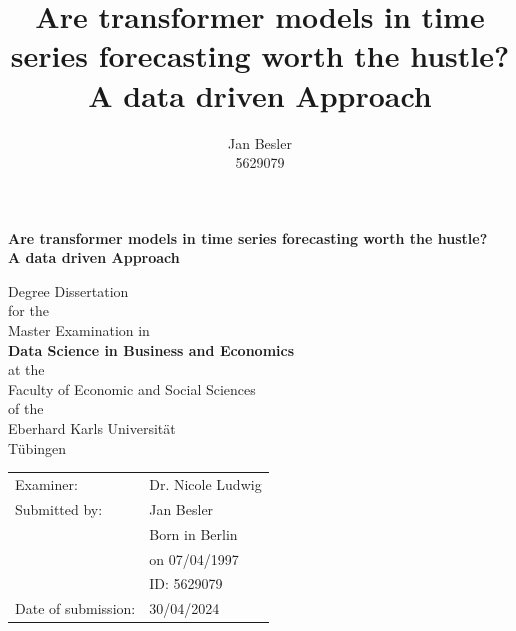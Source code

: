 \documentclass{article}
\title{Are transformer models in time series forecasting worth the hustle? \\
        \Large A data driven Approach}
\author{Jan Besler \\
        5629079}
\begin{document}
\begin{titlepage}       

\thispagestyle{empty}   

\begin{center}
\vspace*{1cm}
{\bf  \Large  
Are transformer models in time series forecasting worth the hustle? \\
A data driven Approach} \\
\vspace*{3cm} 

{  \large  Degree Dissertation} \\
{  \large  for the } \\
{  \large  Master Examination in} \\
{\bf  \large  Data Science in Business and Economics} \\
{  \large  at the} \\
{  \large  Faculty of Economic and Social Sciences} \\
{  \large  of the } \\
{  \large  Eberhard Karls Universität} \\
{  \large  Tübingen} \\

\vspace*{1.2cm} 
\end{center}

\vfill
\begin{normalsize}
\begin{flushright}

\begin{table}[h!]
   \centering
    \begin{flushright}    
    \begin{tabular}{l l }
    Examiner: & Dr. Nicole Ludwig \\
    Submitted by: & Jan Besler \\
       & Born in Berlin \\
       & on 07/04/1997 \\
       & ID: 5629079\\
    Date of submission: & 30/04/2024 \\
\end{tabular} 
\end{flushright}
\end{table}

\end{flushright}
\end{normalsize}

\end{titlepage}
\end{document}
